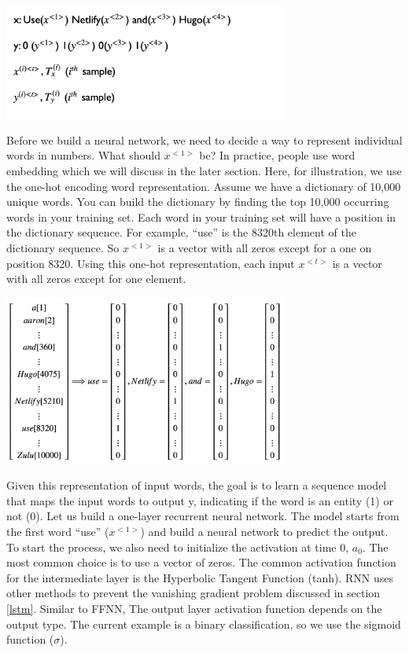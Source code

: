\documentclass[12pt,]{krantz}
\begin{document}
\includegraphics[width=0.7\textwidth,height=\textheight]{images/rnn_notation.png}

Before we build a neural network, we need to decide a way to represent individual words in numbers. What should \(x^{<1>}\) be? In practice, people use word embedding which we will discuss in the later section. Here, for illustration, we use the one-hot encoding word representation. Assume we have a dictionary of 10,000 unique words. You can build the dictionary by finding the top 10,000 occurring words in your training set. Each word in your training set will have a position in the dictionary sequence. For example, ``use'' is the 8320th element of the dictionary sequence. So \(x^{<1>}\) is a vector with all zeros except for a one on position 8320. Using this one-hot representation, each input \(x^{<t>}\) is a vector with all zeros except for one element.

\includegraphics[width=0.7\textwidth,height=\textheight]{images/nn_ohe.png}

Given this representation of input words, the goal is to learn a sequence model that maps the input words to output y, indicating if the word is an entity (1) or not (0). Let us build a one-layer recurrent neural network. The model starts from the first word ``use'' (\(x^{<1>}\)) and build a neural network to predict the output. To start the process, we also need to initialize the activation at time 0, \(a_0\). The most common choice is to use a vector of zeros. The common activation function for the intermediate layer is the Hyperbolic Tangent Function (tanh). RNN uses other methods to prevent the vanishing gradient problem discussed in section \ref{lstm}. Similar to FFNN, The output layer activation function depends on the output type. The current example is a binary classification, so we use the sigmoid function (\(\sigma\)).
\end{document}
